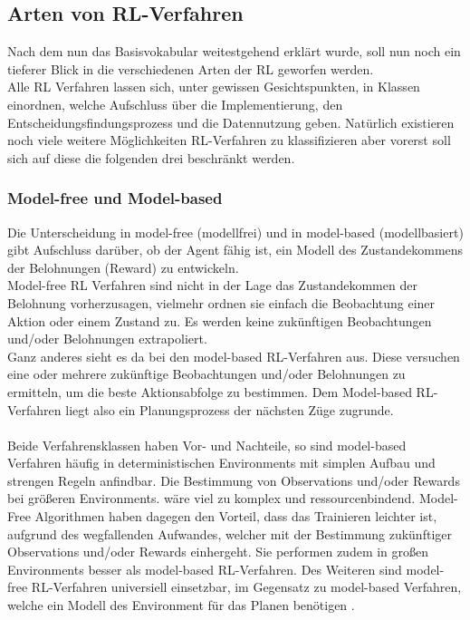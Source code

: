 \subsection{Arten von RL-Verfahren}
Nach dem nun das Basisvokabular weitestgehend erklärt wurde, soll nun noch ein tieferer Blick in die verschiedenen Arten der RL geworfen werden.\\
Alle RL Verfahren lassen sich, unter gewissen Gesichtspunkten, in Klassen einordnen, welche Aufschluss über die Implementierung, den Entscheidungsfindungsprozess und die Datennutzung geben. 
Natürlich existieren noch viele weitere Möglichkeiten RL-Verfahren zu klassifizieren aber vorerst soll sich auf diese die folgenden drei beschränkt werden.

\subsubsection{Model-free und Model-based}
Die Unterscheidung in model-free (modellfrei) und in model-based (modellbasiert) gibt Aufschluss darüber, ob der Agent fähig ist, ein Modell des Zustandekommens der Belohnungen (Reward) zu entwickeln.\\
Model-free RL Verfahren sind nicht in der Lage das Zustandekommen der Belohnung vorherzusagen, vielmehr ordnen sie einfach die Beobachtung einer Aktion oder einem Zustand zu. Es werden keine zukünftigen Beobachtungen und/oder Belohnungen extrapoliert. 
\cite[S. 303 ff. / S. 100 ]{Sutton1998, DRL_Lapan}\\
Ganz anderes sieht es da bei den model-based RL-Verfahren aus. Diese versuchen eine oder mehrere zukünftige Beobachtungen und/oder Belohnungen zu ermitteln, um die beste Aktionsabfolge zu bestimmen. Dem Model-based RL-Verfahren liegt also ein Planungsprozess der nächsten Züge zugrunde. \cite[S. 303 ff.]{Sutton1998}\\
\\Beide Verfahrensklassen haben Vor- und Nachteile, so sind model-based Verfahren häufig in deterministischen Environments mit simplen Aufbau und strengen Regeln anfindbar. Die Bestimmung von Observations und/oder Rewards bei größeren Environments. wäre viel zu komplex und ressourcenbindend. Model-Free Algorithmen haben dagegen den Vorteil, dass das Trainieren leichter ist, aufgrund des wegfallenden Aufwandes, welcher mit der Bestimmung zukünftiger Observations und/oder Rewards einhergeht. Sie performen zudem in großen Environments besser als model-based RL-Verfahren. Des Weiteren sind model-free RL-Verfahren universiell einsetzbar, im Gegensatz zu model-based Verfahren, welche ein Modell des Environment für das Planen benötigen \cite[S. 100 ff.]{DRL_Lapan}.

